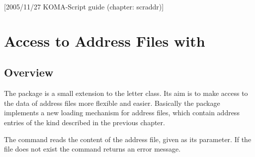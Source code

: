 %
%
%
%
%
%
%
%

[2005/11/27 KOMA-Script guide (chapter: scraddr)]

\chapter{Access to Address Files with }%
%

\section{Overview}\label{sec:scraddr.overview}
The package  is a small extension to
the \KOMAScript{} letter class.
Its aim is to make access to the data of address files
more flexible and easier.
Basically the package implements a new loading mechanism
for address files, which contain address entries of the kind
described in the previous chapter.

\begin{Declaration}
\end{Declaration}%
%
%
The command  reads the content
of the address file, given as its parameter.
If the file does not exist the command returns an
error message.

